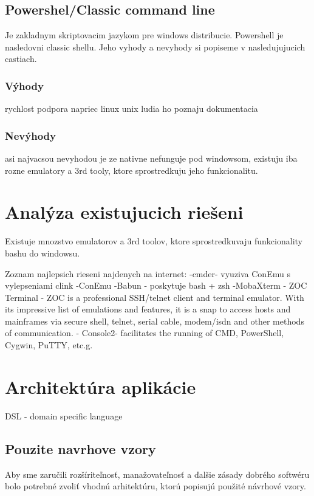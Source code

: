 \subsection{Powershel/Classic command line}
\indent
Je zakladnym skriptovacim jazykom pre windows distribucie.
Powershell je nasledovni classic shellu.  
Jeho vyhody a nevyhody si popiseme v nasledujujucich castiach.

\subsubsection{Výhody}
rychlost
podpora napriec linux unix 
ludia ho poznaju
dokumentacia
\subsubsection{Nevýhody}
asi najvacsou nevyhodou je ze nativne nefunguje pod windowsom, existuju iba rozne emulatory a 3rd tooly, ktore sprostredkuju jeho funkcionalitu.

\section{Analýza existujucich riešeni}
\indent
Existuje mnozstvo emulatorov a 3rd toolov, ktore sprostredkuvaju funkcionality bashu do windowsu.

Zoznam najlepsich rieseni najdenych na internet:
-cmder- vyuziva ConEmu s vylepseniami clink
-ConEmu
-Babun - poskytuje bash + zsh
-MobaXterm
- ZOC Terminal - ZOC is a professional SSH/telnet client and terminal emulator. With its impressive list of emulations and features, it is a snap to access hosts and mainframes via secure shell, telnet, serial cable, modem/isdn and other methods of communication.
- Console2-  facilitates the running of CMD, PowerShell, Cygwin, PuTTY, etc.g.


\section{Architektúra aplikácie}
DSL - domain specific language
\subsection{Pouzite navrhove vzory}
Aby sme zaručili rozšíriteľnosť, manažovateľnosť a ďalšie zásady dobrého softwéru bolo potrebné zvoliť vhodnú arhitektúru, ktorú popisujú použité návrhové vzory.
